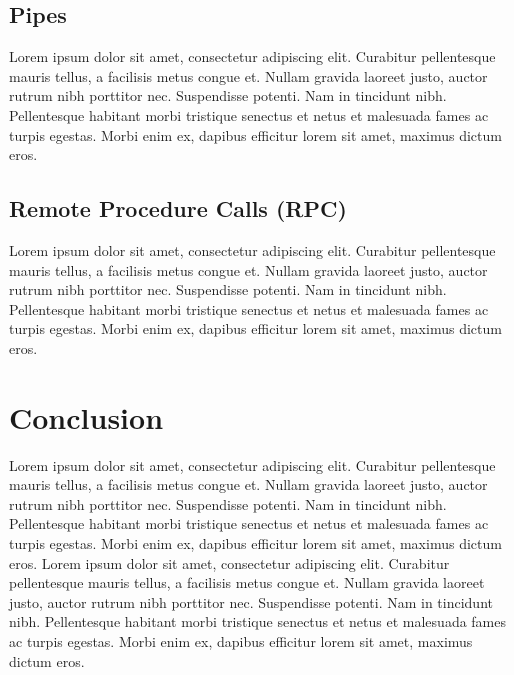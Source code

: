 \documentclass[conference, 12pt]{IEEEtran}
\begin{document}
\subsection{Pipes}
Lorem ipsum dolor sit amet, consectetur adipiscing elit. Curabitur pellentesque mauris tellus, a facilisis metus congue et. Nullam gravida laoreet justo, auctor rutrum nibh porttitor nec. Suspendisse potenti. Nam in tincidunt nibh. Pellentesque habitant morbi tristique senectus et netus et malesuada fames ac turpis egestas. Morbi enim ex, dapibus efficitur lorem sit amet, maximus dictum eros. 

\subsection{Remote Procedure Calls (RPC)}
Lorem ipsum dolor sit amet, consectetur adipiscing elit. Curabitur pellentesque mauris tellus, a facilisis metus congue et. Nullam gravida laoreet justo, auctor rutrum nibh porttitor nec. Suspendisse potenti. Nam in tincidunt nibh. Pellentesque habitant morbi tristique senectus et netus et malesuada fames ac turpis egestas. Morbi enim ex, dapibus efficitur lorem sit amet, maximus dictum eros. 

\section{Conclusion}
Lorem ipsum dolor sit amet, consectetur adipiscing elit. Curabitur pellentesque mauris tellus, a facilisis metus congue et. Nullam gravida laoreet justo, auctor rutrum nibh porttitor nec. Suspendisse potenti. Nam in tincidunt nibh. Pellentesque habitant morbi tristique senectus et netus et malesuada fames ac turpis egestas. Morbi enim ex, dapibus efficitur lorem sit amet, maximus dictum eros. Lorem ipsum dolor sit amet, consectetur adipiscing elit. Curabitur pellentesque mauris tellus, a facilisis metus congue et. Nullam gravida laoreet justo, auctor rutrum nibh porttitor nec. Suspendisse potenti. Nam in tincidunt nibh. Pellentesque habitant morbi tristique senectus et netus et malesuada fames ac turpis egestas. Morbi enim ex, dapibus efficitur lorem sit amet, maximus dictum eros. 
\end{document}
